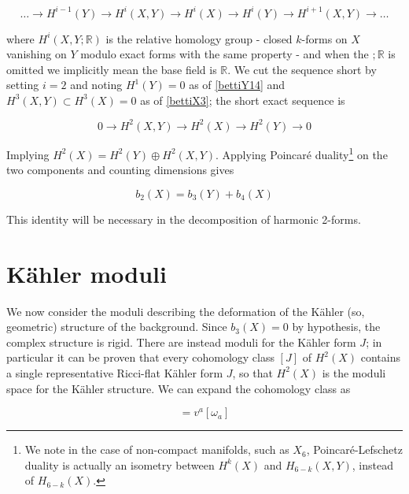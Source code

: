 \begin{equation}
	\ldots \rightarrow H^{i-1}(Y) \rightarrow H^{i}(X,Y) \rightarrow H^i(X) \rightarrow H^i(Y) \rightarrow H^{i+1}(X,Y) \rightarrow \ldots
\end{equation}

where $H^i(X,Y;\mathbb{R})$ is the relative homology group - closed $k$-forms on $X$ vanishing on $Y$ modulo exact forms with the same property - and when the $;\mathbb{R}$ is omitted we implicitly mean the base field is $\mathbb{R}$. We cut the sequence short by setting $i=2$ and noting $H^1(Y) = 0$ as of \ref{bettiY14} and $H^3(X,Y) \subset H^3(X) = 0$ as of \ref{bettiX3}; the short exact sequence is

\begin{equation}
	0 \rightarrow H^2(X,Y) \rightarrow H^2(X) \rightarrow H^2(Y) \rightarrow 0
\end{equation}

Implying $H^2(X) = H^2(Y) \oplus H^2(X,Y)$. Applying Poincaré duality\footnote{We note in the case of non-compact manifolds, such as $X_6$, Poincar\'e-Lefschetz duality is actually an isometry between $H^k(X)$ and $H_{6-k}(X,Y)$, instead of $H_{6-k}(X)$.} on the two components and counting dimensions gives

\begin{equation}
	b_2(X) = b_3(Y) + b_4(X) \label{bettidentity}
\end{equation}

This identity will be necessary in the decomposition of harmonic 2-forms.

\section{K\"ahler moduli} \label{sec:heftkm}

We now consider the moduli describing the deformation of the K\"ahler (so, geometric) structure of the background. Since $b_3(X) = 0$ by hypothesis, the complex structure is rigid. There are instead moduli for the K\"ahler form $J$; in particular it can be proven\cite{goto} that every cohomology class $[J]$ of $H^2(X)$ contains a single representative Ricci-flat K\"ahler form $J$, so that $H^2(X)$ is the moduli space for the K\"ahler structure. We can expand the cohomology class as

\begin{equation}
	[J] = v^a [\omega_a] \label{integraldecomposition}
\end{equation}

